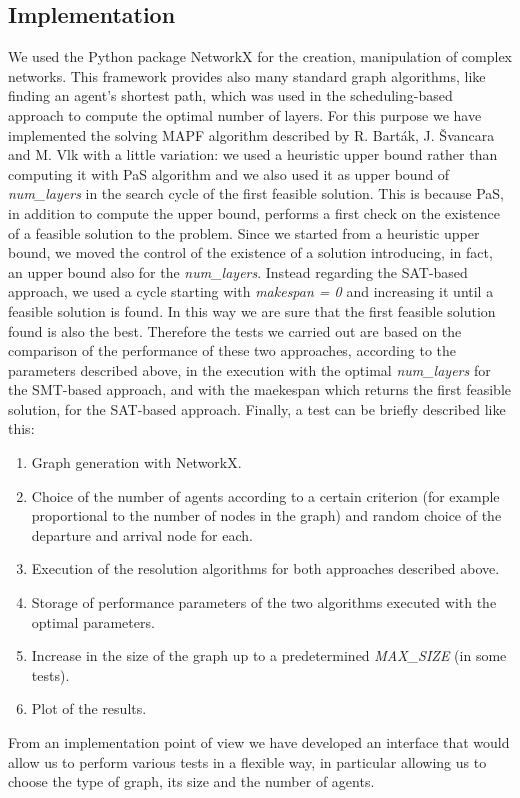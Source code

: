 \documentclass[12pt, a4paper, hidelinks]{article}
\numberwithin{equation}{section}
\begin{document}
\subsection{Implementation}\label{subsec:implementation}
We used the Python package NetworkX for the creation, manipulation of complex networks.
This framework provides also many standard graph algorithms, like finding an agent's shortest path, which was used in the scheduling-based approach to compute the optimal number of layers.
For this purpose we have implemented the solving MAPF algorithm described by R. Barták, J. Švancara and M. Vlk with a little variation:
we used a heuristic upper bound rather than computing it with PaS algorithm and we also used it as upper bound of \textit{num\_layers} in the search cycle of the first feasible solution.
This is because PaS, in addition to compute the upper bound, performs a first check on the existence of a feasible solution to the problem.
Since we started from a heuristic upper bound, we moved the control of the existence of a solution introducing, in fact, an upper bound also for the \textit{num\_layers}.
Instead regarding the SAT-based approach, we used a cycle starting with \textit{makespan = 0} and increasing it until a feasible solution is found.
In this way we are sure that the first feasible solution found is also the best.
Therefore the tests we carried out are based on the comparison of the performance of these two approaches, according to the parameters described above, in the execution with the optimal \textit{num\_layers} for the SMT-based approach, and with the maekespan which returns the first feasible solution, for the SAT-based approach.
Finally, a test can be briefly described like this:
\begin{enumerate}
    \item Graph generation with NetworkX\@.
    \item Choice of the number of agents according to a certain criterion (for example proportional to the number of nodes in the graph) and random choice of the departure and arrival node for each.
    \item Execution of the resolution algorithms for both approaches described above.
    \item Storage of performance parameters of the two algorithms executed with the optimal parameters.
    \item Increase in the size of the graph up to a predetermined \textit{MAX\_SIZE} (in some tests).
    \item Plot of the results.
\end{enumerate}
From an implementation point of view we have developed an interface that would allow us to perform various tests in a flexible way, in particular allowing us
to choose the type of graph, its size and the number of agents.
\end{document}
